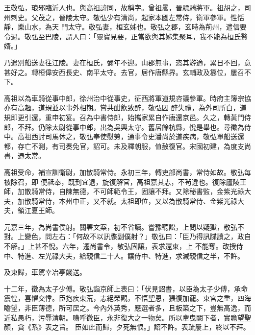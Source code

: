 
\begin{pinyinscope}

 王敬弘，琅邪臨沂人也。與高祖諱同，故稱字。曾祖暠，晉驃騎將軍。祖胡之，司州刺史。父茂之，晉陵太守。敬弘少有清尚，起家本國左常侍，衛軍參軍。性恬靜，樂山水，為天
 門太守。敬弘妻，桓玄姊也。敬弘之郡，玄時為荊州，遣信要令過。敬弘至巴陵，謂人曰：「靈寶見要，正當欲與其姊集聚耳，我不能為桓氏贅婿。」



 乃遣別船送妻往江陵。妻在桓氏，彌年不迎。山郡無事，恣其游適，累日不回，意甚好之。轉桓偉安西長史、南平太守。去官，居作唐縣界。玄輔政及篡位，屢召不下。



 高祖以為車騎從事中郎，徐州治中從事史，征西將軍道規咨議參軍。時府主簿宗協亦有高趣，道規並以事外相期。嘗共酣飲致醉，敬弘因
 醉失禮，為外司所白，道規即更引還，重申初宴。召為中書侍郎，始攜家累自作唐還京邑。久之，轉黃門侍郎，不拜。仍除太尉從事中郎，出為吳興太守。舊居餘杭縣，悅是舉也。尋徵為侍中。高祖西討司馬休之，敬弘奉使慰勞，通事令史潘尚於道疾病，敬弘單船送還都，存亡不測，有司奏免官，詔可。未及釋朝服，值赦復官。宋國初建，為度支尚書，遷太常。



 高祖受命，補宣訓衛尉，加散騎常侍。永初三年，轉吏部尚書，常侍如故。敬弘每被除召，即
 便祗奉，既到宜退，旋復解官，高祖嘉其志，不茍違也。復除廬陵王師，加散騎常侍，自陳無德，不可師範令王，固讓不拜。又除秘書監，金紫光祿大夫，加散騎常侍，本州中正，又不就。太祖即位，又以為散騎常侍、金紫光祿大夫，領江夏王師。



 元嘉三年，為尚書僕射。關署文案，初不省讀。嘗豫聽訟，上問以疑獄，敬弘不對。上變色，問左右：「何故不以訊牒副僕射？」敬弘曰：「臣乃得訊牒讀之，政自不解。」上甚不悅。六年，遷尚書令，敬弘固讓，表求還東，上
 不能奪。改授侍中、特進、左光祿大夫，給親信二十人。讓侍中、特進，求減親信之半，不許。



 及東歸，車駕幸冶亭餞送。



 十二年，徵為太子少傅。敬弘詣京師上表曰：「伏見詔書，以臣為太子少傅，承命震惶，喜懼交悸。臣抱疾東荒，志絕榮觀，不悟聖恩，猥復加寵。東宮之重，四海瞻望，非臣薄德，所可居之。今內外英秀，應選者多，且板築之下，豈無高逸，而近私愚朽，污辱清朝。嗚呼微臣，永非復大之一物矣。所以牽曳闕下者，實瞻望聖顏，貪《系》表之旨。
 臣如此而歸，夕死無恨。」詔不許。表疏屢上，終以不拜。




\end{pinyinscope}
